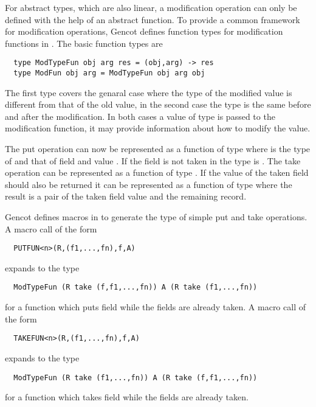 For abstract types, which are also linear, a modification operation can only be defined with the help of an abstract function.
To provide a common framework for modification operations, Gencot defines function types for modification functions 
in . The basic function types are
\begin{verbatim}
  type ModTypeFun obj arg res = (obj,arg) -> res
  type ModFun obj arg = ModTypeFun obj arg obj
\end{verbatim}
The first type covers the genaral case where the type of the modified value is different from that of the old value, in the second
case the type is the same before and after the modification. In both cases a value of type  is passed to the modification
function, it may provide information about how to modify the value. 

The put operation can now be represented as a function of type  where  is the type of
 and  that of field  and value . If the field is not taken in  the type is .
The take operation can be represented as a function of type . If the value of the taken
field should also be returned it can be represented as a function of type  where the result
is a pair of the taken field value and the remaining record.

Gencot defines macros in  to generate the type of simple put and take operations.
A macro call of the form 
\begin{verbatim}
  PUTFUN<n>(R,(f1,...,fn),f,A)
\end{verbatim}
expands to the type
\begin{verbatim}
  ModTypeFun (R take (f,f1,...,fn)) A (R take (f1,...,fn)) 
\end{verbatim}
for a function which puts field  while the fields  are already taken. A macro call of the form
\begin{verbatim}
  TAKEFUN<n>(R,(f1,...,fn),f,A)
\end{verbatim}
expands to the type
\begin{verbatim}
  ModTypeFun (R take (f1,...,fn)) A (R take (f,f1,...,fn)) 
\end{verbatim}
for a function which takes field  while the fields  are already taken.

